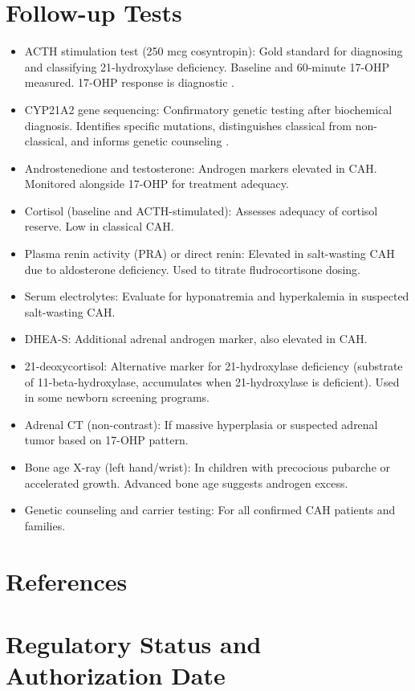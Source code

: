 \section*{Follow-up Tests}
\begin{itemize}
  \item ACTH stimulation test (250 mcg cosyntropin): Gold standard for diagnosing and classifying 21-hydroxylase deficiency. Baseline and 60-minute 17-OHP measured. 17-OHP response is diagnostic \cite{speiser2018congenital}.
  \item CYP21A2 gene sequencing: Confirmatory genetic testing after biochemical diagnosis. Identifies specific mutations, distinguishes classical from non-classical, and informs genetic counseling \cite{elmaouche2017congenital}.
  \item Androstenedione and testosterone: Androgen markers elevated in CAH. Monitored alongside 17-OHP for treatment adequacy.
  \item Cortisol (baseline and ACTH-stimulated): Assesses adequacy of cortisol reserve. Low in classical CAH.
  \item Plasma renin activity (PRA) or direct renin: Elevated in salt-wasting CAH due to aldosterone deficiency. Used to titrate fludrocortisone dosing.
  \item Serum electrolytes: Evaluate for hyponatremia and hyperkalemia in suspected salt-wasting CAH.
  \item DHEA-S: Additional adrenal androgen marker, also elevated in CAH.
  \item 21-deoxycortisol: Alternative marker for 21-hydroxylase deficiency (substrate of 11-beta-hydroxylase, accumulates when 21-hydroxylase is deficient). Used in some newborn screening programs.
  \item Adrenal CT (non-contrast): If massive hyperplasia or suspected adrenal tumor based on 17-OHP pattern.
  \item Bone age X-ray (left hand/wrist): In children with precocious pubarche or accelerated growth. Advanced bone age suggests androgen excess.
  \item Genetic counseling and carrier testing: For all confirmed CAH patients and families.
\end{itemize}

\section*{References}


\clearpage
\section*{Regulatory Status and Authorization Date}

\clearpage
